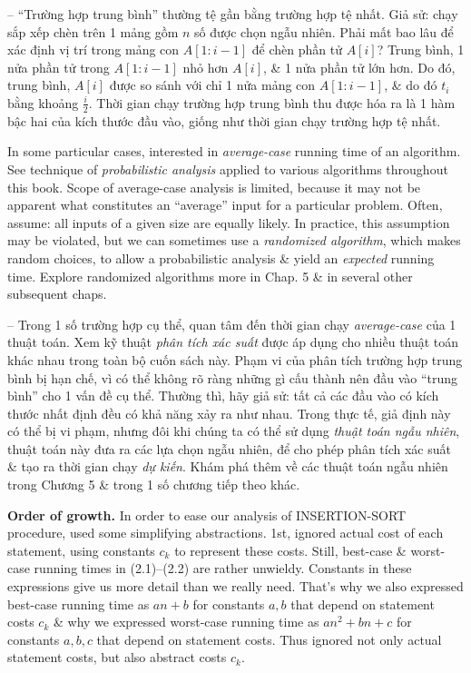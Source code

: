 \documentclass{article}
\begin{document}
\begin{itemize}
\begin{itemize}
\begin{itemize}
\begin{enumerate}
                -- ``Trường hợp trung bình'' thường tệ gần bằng trường hợp tệ nhất. Giả sử: chạy sắp xếp chèn trên 1 mảng gồm $n$ số được chọn ngẫu nhiên. Phải mất bao lâu để xác định vị trí trong mảng con $A[1:i - 1]$ để chèn phần tử $A[i]$? Trung bình, 1 nửa phần tử trong $A[1:i - 1]$ nhỏ hơn $A[i]$, \& 1 nửa phần tử lớn hơn. Do đó, trung bình, $A[i]$ được so sánh với chỉ 1 nửa mảng con $A[1:i - 1]$, \& do đó $t_i$ bằng khoảng $\frac{i}{2}$. Thời gian chạy trường hợp trung bình thu được hóa ra là 1 hàm bậc hai của kích thước đầu vào, giống như thời gian chạy trường hợp tệ nhất.
            \end{enumerate}
            In some particular cases, interested in {\it average-case} running time of an algorithm. See technique of {\it probabilistic analysis} applied to various algorithms throughout this book. Scope of average-case analysis is limited, because it may not be apparent what constitutes an ``average'' input for a particular problem. Often, assume: all inputs of a given size are equally likely. In practice, this assumption may be violated, but we can sometimes use a {\it randomized algorithm}, which makes random choices, to allow a probabilistic analysis \& yield an {\it expected} running time. Explore randomized algorithms more in Chap. 5 \& in several other subsequent chaps.
            
            -- Trong 1 số trường hợp cụ thể, quan tâm đến thời gian chạy {\it average-case} của 1 thuật toán. Xem kỹ thuật {\it phân tích xác suất} được áp dụng cho nhiều thuật toán khác nhau trong toàn bộ cuốn sách này. Phạm vi của phân tích trường hợp trung bình bị hạn chế, vì có thể không rõ ràng những gì cấu thành nên đầu vào ``trung bình'' cho 1 vấn đề cụ thể. Thường thì, hãy giả sử: tất cả các đầu vào có kích thước nhất định đều có khả năng xảy ra như nhau. Trong thực tế, giả định này có thể bị vi phạm, nhưng đôi khi chúng ta có thể sử dụng {\it thuật toán ngẫu nhiên}, thuật toán này đưa ra các lựa chọn ngẫu nhiên, để cho phép phân tích xác suất \& tạo ra thời gian chạy {\it dự kiến}. Khám phá thêm về các thuật toán ngẫu nhiên trong Chương 5 \& trong 1 số chương tiếp theo khác.
            
            {\bf Order of growth.} In order to ease our analysis of INSERTION-SORT procedure, used some simplifying abstractions. 1st, ignored actual cost of each statement, using constants $c_k$ to represent these costs. Still, best-case \& worst-case running times in (2.1)--(2.2) are rather unwieldy. Constants in these expressions give us more detail than we really need. That's why we also expressed best-case running time as $an + b$ for constants $a,b$ that depend on statement costs $c_k$ \& why we expressed worst-case running time as $an^2 + bn + c$ for constants $a,b,c$ that depend on statement costs. Thus ignored not only actual statement costs,  but also abstract costs $c_k$.
            

\end{itemize}
\end{itemize}
\end{itemize}
\end{document}

